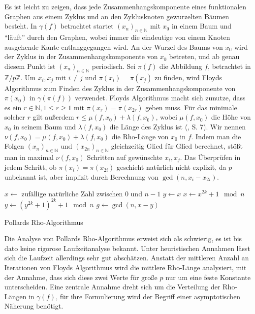 \documentclass[a4paper, 11pt, ngerman]{article}
\newcommand{\N}{\mathbb{N}}
\newcommand{\Z}{\mathbb{Z}}
\begin{document}
\noindent Es ist leicht zu zeigen, dass jede Zusammenhangskomponente eines funktionalen Graphen aus einem Zyklus und an den Zyklusknoten gewurzelten Bäumen besteht. In $\gamma(f)$ betrachtet startet $(x_n)_{n \in \N}$ mit $x_0$ in einem Baum und "`läuft"' durch den Graphen, wobei immer die eindeutige von einem Knoten ausgehende Kante entlanggegangen wird. An der Wurzel des Baums von $x_0$ wird der Zyklus in der Zusammenhangskomponente von $x_0$ betreten, und ab genau diesem Punkt ist $(x_n)_{n \in \N}$ periodisch. Sei $\pi(f)$ die Abbildung $f$, betrachtet in $\Z/p\Z$. Um $x_i, x_j$ mit $i \ne j$ und $\pi(x_i) = \pi(x_j)$ zu finden, wird Floyds Algorithmus zum Finden des Zyklus in der Zusammenhangskomponente von $\pi(x_0)$ in $\gamma(\pi(f))$ verwendet. Floyds Algorithmus macht sich zunutze, dass es ein $r \in \N, 1 \le r \ge 1$ mit $\pi(x_r) = \pi(x_{2r})$ geben muss. Für das minimale solcher $r$ gilt außerdem $r \le \mu(f, x_0) + \lambda(f, x_0)$, wobei $\mu(f, x_0)$ die Höhe von $x_0$ in seinem Baum und $\lambda(f, x_0)$ die Länge des Zyklus ist (\cite{knu98}, S. 7). Wir nennen $\nu(f, x_0) = \mu(f, x_0) + \lambda(f, x_0)$ die Rho-Länge von $x_0$ in $f$. Indem man die Folgen $(x_n)_{n \in \N}$ und $(x_{2n})_{n \in \N}$ gleichzeitig Glied für Glied berechnet, stößt man in maximal $\nu(f, x_0)$ Schritten auf gewünschte $x_i, x_j$. Das Überprüfen in jedem Schritt, ob $\pi(x_i) = \pi(x_{2i})$ geschieht natürlich nicht explizit, da $p$ unbekannt ist, aber implizit durch Berechnung von $\gcd(n, x_i - x_{2i})$.

\begin{algorithm*}
    $x \gets $ zufällige natürliche Zahl zwischen $0$ und $n - 1$ \;
    $y \gets x$ \;
    {
        $x \gets x^{2k} + 1 \mod n$ \;
        $y \gets (y^{2k} + 1)^{2k} + 1 \mod n$ \;
        $g \gets \gcd(n, x - y)$ \;
        {
             \;
        }
    }

    \caption{Pollards Rho-Algorithmus}
\end{algorithm*}

\noindent Die Analyse von Pollards Rho-Algorithmus erweist sich als schwierig, es ist bis dato keine rigorose Laufzeitanalyse bekannt. Unter heuristischen Annahmen lässt sich die Laufzeit allerdings sehr gut abschätzen. Anstatt der mittleren Anzahl an Iterationen von Floyds Algorithmus wird die mittlere Rho-Länge analysiert, mit der Annahme, dass sich diese zwei Werte für große $p$ nur um eine feste Konstante unterscheiden. Eine zentrale Annahme dreht sich um die Verteilung der Rho-Längen in $\gamma(f)$, für ihre Formulierung wird der Begriff einer asymptotischen Näherung benötigt.
\end{document}
